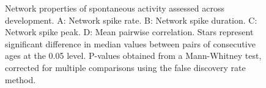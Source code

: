 \documentclass{article}\usepackage[]{graphicx}\usepackage[]{color}
\begin{document}
\begin{figure}
  \centering
  \caption{Network properties of spontaneous activity assessed
    across development.  A: Network spike rate.  B: Network spike
    duration.  C: Network spike peak. D: Mean pairwise correlation. Stars represent significant difference in median values between pairs of consecutive ages at the 0.05 level. P-values obtained from a Mann-Whitney test, corrected for multiple comparisons using the false discovery rate method.}
\end{figure}
\end{document}
